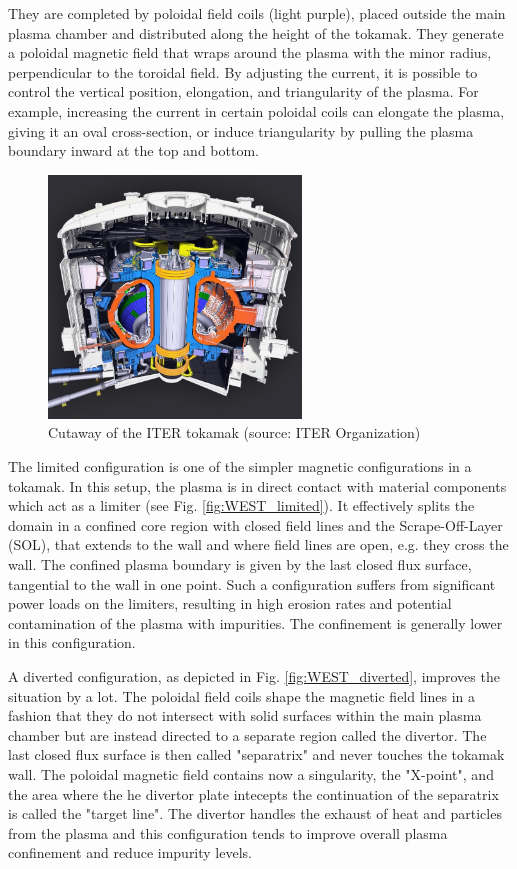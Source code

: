 They are completed by poloidal field coils (light purple), placed outside the main plasma chamber and distributed along the height of the tokamak. They generate a poloidal magnetic field that wraps around the plasma with the minor radius, perpendicular to the toroidal field. By adjusting the current, it is possible to control the vertical position, elongation, and triangularity of the plasma. For example, increasing the current in certain poloidal coils can elongate the plasma, giving it an oval cross-section, or induce triangularity by pulling the plasma boundary inward at the top and bottom. 

\begin{figure}[H]
	\centering
	\includegraphics[width=0.6\textwidth]{schemes/ITER_2.jpg}
	\caption{Cutaway of the ITER tokamak (source: ITER Organization)}
	\label{fig:1_ITER}
\end{figure}

The limited configuration is one of the simpler magnetic configurations in a tokamak. In this setup, the plasma is in direct contact with material components which act as a limiter (see Fig. \ref{fig:WEST_limited}). It effectively splits the domain in a confined core region with closed field lines and the Scrape-Off-Layer (SOL), that extends to the wall and where field lines are open, e.g. they cross the wall. The confined plasma boundary is given by the last closed flux surface, tangential to the wall in one point. Such a configuration suffers from significant power loads on the limiters, resulting in high erosion rates and potential contamination of the plasma with impurities. The confinement is generally lower in this configuration. 

A diverted configuration, as depicted in Fig. \ref{fig:WEST_diverted}, improves the situation by a lot. The poloidal field coils shape the magnetic field lines in a fashion that they do not intersect with solid surfaces within the main plasma chamber but are instead directed to a separate region called the divertor. The last closed flux surface is then called "separatrix" and never touches the tokamak wall. The poloidal magnetic field contains now a singularity, the "X-point", and the area where the he divertor plate intecepts the continuation of the separatrix is called the "target line". The divertor handles the exhaust of heat and particles from the plasma and this configuration tends to improve overall plasma confinement and reduce impurity levels.

